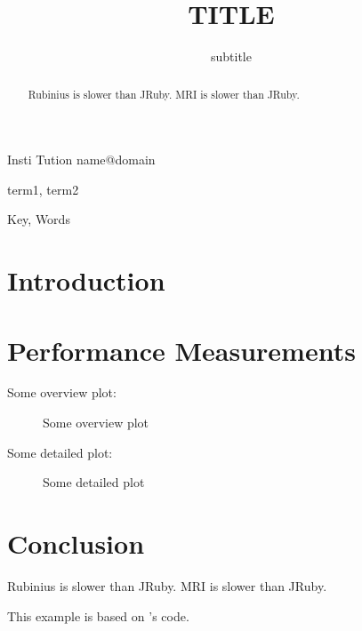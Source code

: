 \documentclass[10pt,natbib,numbers,preprint]{sigplanconf}
\def\Title{TITLE}
\def\Subtitle{subtitle}
\begin{document}

\title{\Title}
\subtitle{\Subtitle}

           {Insti Tution}
           {name@domain}


\maketitle



\begin{abstract}
  Rubinius is \RBXOverJRubyX slower than JRuby.
  MRI is \MRIOverJRubyX slower than JRuby.
\end{abstract}


\terms
term1, term2

\keywords
Key, Words

\section{Introduction}

\section{Performance Measurements}


Some overview plot:

\begin{figure}
\begin{center}
\PerfOverview
\end{center}
\vspace*{-5pt}
\caption{Some overview plot}
\label{fig:perf-overview}
\end{figure}

Some detailed plot:

\begin{figure}
\begin{center}
\BenchmarkDetails
\end{center}
\vspace*{-10pt}
\caption{Some detailed plot}
\label{fig:benchmarks}
\end{figure}

\pagebreak
\section{Conclusion}

Rubinius is \RBXOverJRubyX slower than JRuby.
MRI is \MRIOverJRubyX slower than JRuby.

This example is based on \citet{PerfLatexPaper}'s code.



\end{document}
